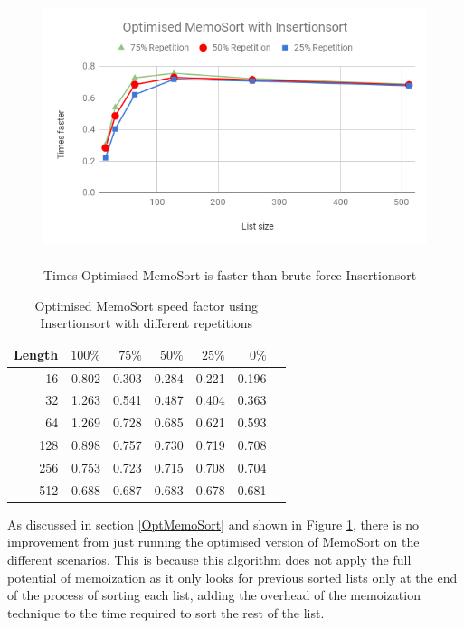 \documentclass[a4paper,12pt]{article}
\begin{document}
\begin{figure}[H]
    \centering
    \includegraphics[height=8cm,keepaspectratio]{./images/OptMemoSortIns.png}
    \caption{Times Optimised MemoSort is faster than brute force Insertionsort}
    \label{fig:OptMemoSortInsGraph}
\end{figure}

\begin{table}[H]
\centering
\begin{tabular}{|r|r|r|r|r|r|r|}   \hline
	{Length} & {$100\%$} & {$75\%$} & {$50\%$} & {$25\%$} & {$0\%$} \\  \hline
	16 &0.802&0.303 & 0.284 & 0.221 & 0.196\\ 
	32 &1.263&0.541 & 0.487& 0.404& 0.363\\ 
	64 &1.269 &0.728&0.685&0.621& 0.593\\ 
	128 &0.898&0.757&0.730&0.719 &0.708\\ 
	256 &0.753&0.723&0.715&0.708&0.704\\ 
	512 & 0.688&0.687&0.683 &0.678 &0.681\\  \hline
\end{tabular}
\caption{Optimised MemoSort  speed factor using Insertionsort with different repetitions}
\label{fig:OptMemoSortInsTable}
\end{table}


As discussed in section \ref{OptMemoSort} and shown in Figure \ref{fig:OptMemoSortInsGraph}, there is no improvement from just running the optimised version of MemoSort on the different scenarios. This is because this algorithm does not apply the full potential of memoization as it only looks for previous sorted lists only at the end of the process of sorting each list, adding the overhead of the memoization technique to the time required to sort the rest of the list. \\
\end{document}
